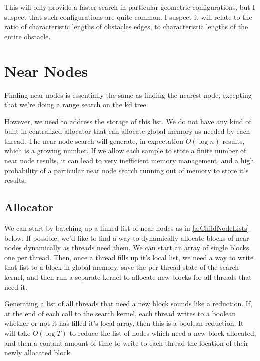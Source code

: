 This will only provide a faster search in particular geometric configurations, but I suspect that such configurations are quite common. I suspect it will relate to the ratio of characteristic lengths of obstacles edges, to characteristic lengths of the entire obstacle. 
 

\section{Near Nodes}
\label{a:NearNodes}
Finding near nodes is essentially the same as finding the nearest node, excepting that we're doing a range search on the kd tree. 

However, we need to address the storage of this list. We do not have any kind of built-in centralized allocator that can allocate global memory as needed by each thread. The near node search will generate, in expectation $O(\log n)$ results, which is a growing number. If we allow each sample to store a finite number of near node results, it can lead to very inefficient memory management, and a high probability of a particular near node search running out of memory to store it's results. 

\subsection{Allocator}
We can start by batching up a linked list of near nodes as in  \ref{a:ChildNodeLists} below. If possible, we'd like to find a way to dynamically allocate blocks of near nodes dynamically as threads need them. We can start an array of single blocks, one per thread. Then, once a thread fills up it's local list, we need a way to write that list to a block in global memory, save the per-thread state of the search kernel, and then run a separate kernel to allocate new blocks for all threads that need it. 

Generating a list of all threads that need a new block sounds like a reduction. If, at the end of each call to the search kernel, each thread writes to a boolean whether or not it has filled it's local array, then this is a boolean reduction. It will take $O(\log T)$ to reduce the list of nodes which need a new block allocated, and then a contant amount of time to write to each thread the location of their newly allocated block. 

\begin{figure}[H]
\begin{centering}
    \texttt{[image: \\figfile\{fig/near\_list\_allocator]}}
    \caption{Near List Allocator}
    \label{fig:near_alloc}
\end{centering} 
\end{figure}

